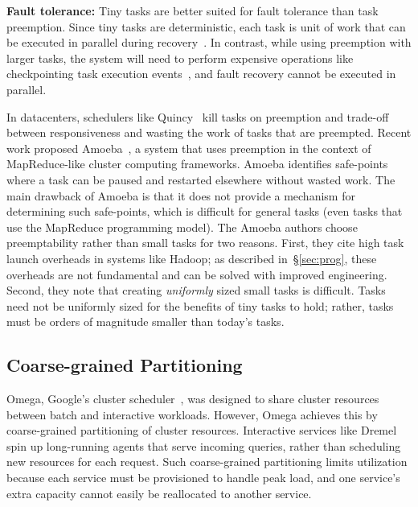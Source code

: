 

\vspace{4pt}\noindent\textbf{Fault tolerance:}
Tiny tasks are better suited for
fault tolerance than task preemption. Since tiny tasks
are deterministic, each task is unit of work that can be executed in parallel
 during recovery~\cite{zaharia2012discretized}.
In contrast, while using 
preemption with larger tasks, the system will need to perform expensive
operations like checkpointing task execution events~\cite{dunlap2002revirt},
and fault recovery cannot be executed in parallel.

In datacenters, schedulers like Quincy~\cite{isard2009quincy} kill tasks on
preemption and trade-off between responsiveness and wasting the work of tasks
that are preempted.  Recent work proposed Amoeba~\cite{ananthanarayanan2012true},
a system that uses preemption in the context of MapReduce-like
cluster computing frameworks. Amoeba identifies safe-points where a task can be
paused and restarted elsewhere without wasted work. The main drawback of Amoeba
is that it does not provide a mechanism for determining such safe-points, which
is difficult for general tasks (even tasks that use the MapReduce programming
model).  The Amoeba authors choose preemptability rather than small tasks for
two reasons. First, they cite high task launch overheads in systems like
Hadoop; as described in~\S\ref{sec:prog}, these overheads are not fundamental
and can be solved with improved engineering. Second, they note that creating
\emph{uniformly} sized small tasks is difficult. Tasks need not be uniformly
sized for the benefits of tiny tasks to hold; rather, tasks must be orders of
magnitude smaller than today's tasks.

\subsection{Coarse-grained Partitioning}
Omega, Google's cluster scheduler~\cite{melnik2010dremel},
was designed to share cluster
resources between batch and interactive workloads. However, Omega achieves
this by coarse-grained partitioning of cluster resources.
Interactive services like Dremel~\cite{melnik2010dremel} spin up long-running
agents that serve incoming queries, rather than scheduling new resources for
each request.  Such coarse-grained partitioning limits utilization because each service
must be provisioned to handle peak load, and one service's extra capacity
cannot easily be reallocated to another service.

